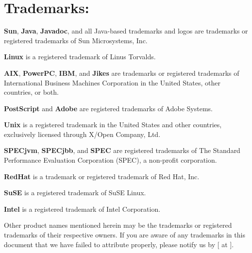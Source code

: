 \section*{Trademarks:}
\label{trademarks}

{\bf Sun}, {\bf Java}, {\bf Javadoc}, and all Java-based trademarks
and logos are trademarks or registered trademarks of Sun Microsystems,
Inc. 

{\bf Linux} is a registered trademark of Linus Torvalds.

{\bf AIX}, {\bf PowerPC}, {\bf IBM}, and {\bf Jikes} are
trademarks or 
registered trademarks of International Business Machines Corporation in the
United States, other countries, or both.

{\bf PostScript} and {\bf Adobe} are registered trademarks of Adobe Systems.

{\bf Unix} is a registered trademark in the United States and other
countries, exclusively licensed through X/Open Company, Ltd.

{\bf SPECjvm}, {\bf SPECjbb}, and {\bf SPEC} are registered
trademarks of The Standard Performance Evaluation Corporation (SPEC),
a non-profit corporation. 

{\bf RedHat} is a trademark or registered trademark of Red Hat, Inc.

{\bf SuSE} is a registered trademark of SuSE Linux.

{\bf Intel} is a registered trademark of Intel Corporation.

Other product names mentioned herein may be the trademarks or
registered trademarks of their respective owners.  If you are aware of
any trademarks in this document that we have failed to attribute
properly, please notify us by [ at {\tt \RVMBugURL}]{\RVMBugURL}.


